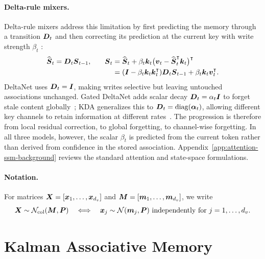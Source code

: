 \documentclass{article} %
\begin{document}
\paragraph{Delta-rule mixers.}
Delta-rule mixers address this limitation by first predicting the memory through a transition
$\boldsymbol{D}_t$ and then correcting its prediction at the current key with write strength $\beta_t$
\citep{schlag2021linear,yang2024parallelizing}:
\begin{equation}
\begin{aligned}
  \widehat{\boldsymbol{S}}_t
  &=\boldsymbol{D}_t\boldsymbol{S}_{t-1},
  &\quad \boldsymbol{S}_t
  &=\widehat{\boldsymbol{S}}_t
    +\beta_t\boldsymbol{k}_t
      \big(\boldsymbol{v}_t-\widehat{\boldsymbol{S}}_t^{\intercal}\boldsymbol{k}_t\big)^{\intercal}\\
  &&&=(\boldsymbol{I}-\beta_t\boldsymbol{k}_t\boldsymbol{k}_t^{\intercal})\boldsymbol{D}_t\boldsymbol{S}_{t-1}
    +\beta_t\boldsymbol{k}_t\boldsymbol{v}_t^{\intercal}.
\end{aligned}
\label{eq:unified-delta-rule}
\end{equation}
DeltaNet uses $\boldsymbol{D}_t=\boldsymbol{I}$, making writes selective but leaving untouched associations
unchanged. Gated DeltaNet adds scalar decay $\boldsymbol{D}_t=\alpha_t\boldsymbol{I}$ to forget stale content
globally~\citep{yang2024gdn}; KDA generalizes this to
$\boldsymbol{D}_t=\operatorname{diag}(\boldsymbol{\alpha}_t)$, allowing different key channels to retain information at different
rates~\citep{kimiteam2025kimilinear}. The progression is therefore from local residual correction,
to global forgetting, to channel-wise forgetting. In all three models, however, the scalar
$\beta_t$ is predicted from the current token rather than derived from confidence in the stored
association. Appendix~\ref{app:attention-ssm-background} reviews the standard attention and
state-space formulations.

\paragraph{Notation.}
For matrices $\boldsymbol{X}=[\boldsymbol{x}_1,\ldots,\boldsymbol{x}_{d_v}]$ and
$\boldsymbol{M}=[\boldsymbol{m}_1,\ldots,\boldsymbol{m}_{d_v}]$, we write
\begin{equation}
  \boldsymbol{X}\sim\mathcal N_{\mathrm{col}}(\boldsymbol{M},\boldsymbol{P})
  \quad\Longleftrightarrow\quad
  \boldsymbol{x}_j\sim\mathcal N(\boldsymbol{m}_j,\boldsymbol{P})
  \ \text{independently for }j=1,\ldots,d_v.
  \label{eq:columnwise-gaussian-notation}
\end{equation}

\section{Kalman Associative Memory}
\label{sec:memory-kalman}
\end{document}
